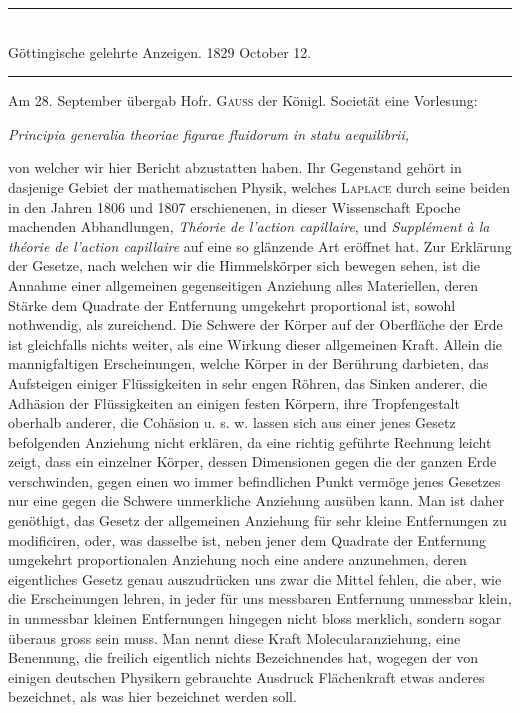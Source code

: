 \clearpage
{}
\GaussVSourceUnnumbered
{}
\begin{center}
\rule{.70\linewidth}{.4pt}\\[.7\baselineskip]
Göttingische gelehrte Anzeigen. 1829 October 12.\\[.7\baselineskip]
\rule{.70\linewidth}{.4pt}
\end{center}

Am 28. September übergab Hofr. \textsc{Gauss} der Königl. Societät eine Vorlesung:
\begin{center}
\textit{Principia generalia theoriae figurae fluidorum in statu aequilibrii,}
\end{center}
\noindent
von welcher wir hier Bericht abzustatten haben. Ihr Gegenstand gehört in dasjenige
Gebiet der mathematischen Physik, welches \textsc{Laplace} durch seine beiden in den
Jahren 1806 und 1807 erschienenen, in dieser Wissenschaft Epoche machenden
Abhandlungen, \textit{Théorie de l'action capillaire}, und \textit{Supplément à la théorie
de l'action capillaire} auf eine so glänzende Art eröffnet hat. Zur Erklärung der
Gesetze, nach welchen wir die Himmelskörper sich bewegen sehen, ist die Annahme
einer allgemeinen gegenseitigen Anziehung alles Materiellen, deren Stärke dem
Quadrate der Entfernung umgekehrt proportional ist, sowohl nothwendig, als
zureichend. Die Schwere der Körper auf der Oberfläche der Erde ist gleichfalls
nichts weiter, als eine Wirkung dieser allgemeinen Kraft. Allein die mannigfaltigen
Erscheinungen, welche Körper in der Berührung darbieten, das Aufsteigen einiger
Flüssigkeiten in sehr engen Röhren, das Sinken anderer, die Adhäsion der Flüssigkeiten
an einigen festen Körpern, ihre Tropfengestalt oberhalb anderer, die Cohäsion
u. s. w. lassen sich aus einer jenes Gesetz befolgenden Anziehung nicht erklären,
da eine richtig geführte Rechnung leicht zeigt, dass ein einzelner Körper, dessen
Dimensionen gegen die der ganzen Erde verschwinden, gegen einen wo immer
befindlichen Punkt vermöge jenes Gesetzes
\clearpage
{}
\noindent
nur eine gegen die Schwere unmerkliche Anziehung ausüben kann. Man ist daher
genöthigt, das Gesetz der allgemeinen Anziehung für sehr kleine Entfernungen zu
modificiren, oder, was dasselbe ist, neben jener dem Quadrate der Entfernung
umgekehrt proportionalen Anziehung noch eine andere anzunehmen, deren eigentliches
Gesetz genau auszudrücken uns zwar die Mittel fehlen, die aber, wie die Erscheinungen
lehren, in jeder für uns messbaren Entfernung unmessbar klein, in unmessbar
kleinen Entfernungen hingegen nicht bloss merklich, sondern sogar überaus gross
sein muss. Man nennt diese Kraft Molecularanziehung, eine Benennung, die freilich
eigentlich nichts Bezeichnendes hat, wogegen der von einigen deutschen Physikern
gebrauchte Ausdruck Flächenkraft etwas anderes bezeichnet, als was hier bezeichnet
werden soll.

